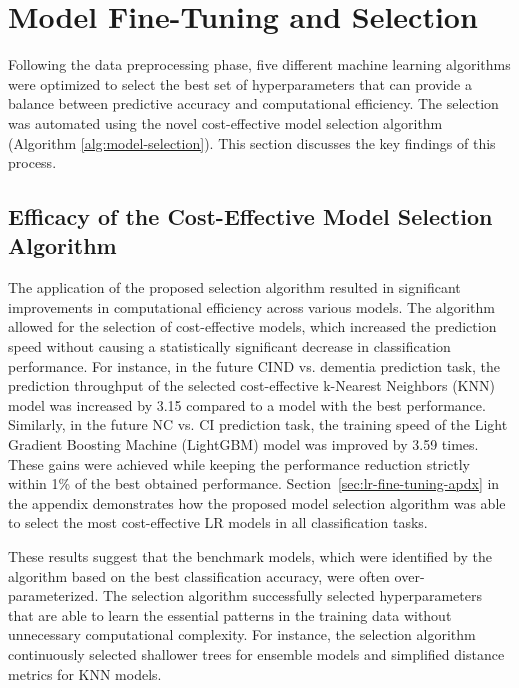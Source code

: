 \section{Model Fine-Tuning and Selection}

Following the data preprocessing phase, five different machine learning algorithms were optimized to select the best set of hyperparameters that can provide a balance between predictive accuracy and computational efficiency. The selection was automated using the novel cost-effective model selection algorithm (Algorithm \ref{alg:model-selection}). This section discusses the key findings of this process.

\subsection{Efficacy of the Cost-Effective Model Selection Algorithm}
The application of the proposed selection algorithm resulted in significant improvements in computational efficiency across various models. The algorithm allowed for the selection of cost-effective models, which increased the prediction speed without causing a statistically significant decrease in classification performance. For instance, in the future CIND vs. dementia prediction task, the prediction throughput of the selected cost-effective k-Nearest Neighbors (\acrshort{KNN}) model was increased by 3.15 compared to a model with the best performance. Similarly, in the future NC vs. CI prediction task, the training speed of the Light Gradient Boosting Machine (\acrshort{LightGBM}) model was improved by 3.59 times. These gains were achieved while keeping the performance reduction strictly within 1\% of the best obtained performance. Section~\ref{sec:lr-fine-tuning-apdx} in the appendix demonstrates how the proposed model selection algorithm was able to select the most cost-effective LR models in all classification tasks.

These results suggest that the benchmark models, which were identified by the algorithm based on the best classification accuracy, were often over-parameterized. The selection algorithm successfully selected hyperparameters that are able to learn the essential patterns in the training data without unnecessary computational complexity. For instance, the selection algorithm continuously selected shallower trees for ensemble models and simplified distance metrics for KNN models.

